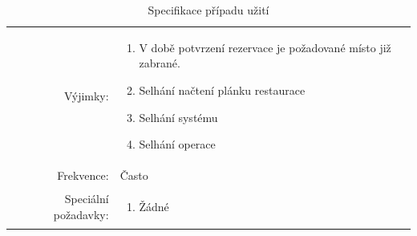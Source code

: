 \documentclass[a4paper,10pt]{article}
\begin{document}
\begin{table}[ht!]
{\begin{tabular}{| r | p{12cm} |}
\begin{minipage}[t]{0.75\textwidth}
  	\end{minipage} \\
    \hline
    Výjimky: & 
    \begin{minipage}[t]{0.75\textwidth}
    	\begin{enumerate}[nosep,after=\strut]
    		\item V době potvrzení rezervace je požadované místo již zabrané.
            \item Selhání načtení plánku restaurace
            \item Selhání systému
            \item Selhání operace
    	\end{enumerate}
  	\end{minipage} \\
    \hline
    Frekvence: & Často \\
    \hline
    Speciální požadavky: & 
    \begin{minipage}[t]{0.75\textwidth}
    	\begin{enumerate}[nosep,after=\strut]
    		\item Žádné
    	\end{enumerate}
  	\end{minipage} \\
    \hline

\end{tabular}}
\caption{Specifikace případu užití }
\label{table:1}
\end{table}


\end{document}
